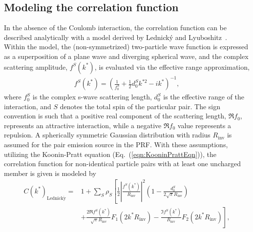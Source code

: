 \documentclass[ALICE,manyauthors]{cernphprep}
\begin{document}
\subsection{Modeling the correlation function}
\label{sec:ModelingCF}


In the absence of the Coulomb interaction, the correlation function can be described analytically with a model derived by Lednick\'y and Lyuboshitz~\cite{Lednicky:82}.
Within the model, the (non-symmetrized) two-particle wave function is expressed as a superposition of a plane wave and diverging spherical wave, and the complex scattering amplitude, $f^{S}(k^{*})$, is evaluated via the effective range approximation,
\begin{equation}
\begin{aligned}
f^{S}(k^{*}) = \left( \frac{1}{f^{S}_{0}} + \frac{1}{2}d^{S}_{0}k^{*2} - ik^{*} \right)^{-1},
\end{aligned}
\label{eqn:ScatteringParam}
\end{equation}
where $f^{S}_{0}$ is the complex s-wave scattering length, $d^{S}_{0}$ is the effective range of the interaction, and $S$ denotes the total spin of the particular pair.
The sign convention is such that a positive real component of the scattering length, $\Re f_{0}$, represents an attractive interaction, while a negative {\color{red}$\Re f_{0}$} {\color{blue}value} represents a repulsion.
A spherically symmetric Gaussian distribution with radius $R_{\mathrm{inv}}$  is assumed for the pair emission source in the PRF.
With these assumptions, utilizing the Koonin-Pratt equation (Eq.~{\color{blue}(}\ref{eqn:KooninPrattEqn}{\color{blue})}), the correlation function for non-identical particle pairs {\color{red}with at least one uncharged member is given} {\color{blue}is modeled} by~\cite{Lednicky:82}
\begin{equation}
\begin{aligned}
C(k^{*})_{\mathrm{Lednick\acute{y}}} = &1 + \sum_{S}\rho_{S}\left[\frac{1}{2}\left|\frac{f^{S}(k^{*})}{R_{\mathrm{inv}}}\right|^2\left(1-\frac{d^{S}_{0}}{2\sqrt{\pi}R_{\mathrm{inv}}}\right) \right. \\
&+ \left. \frac{2\Re f^{S}(k^{*})}{\sqrt{\pi}R_{\mathrm{inv}}}F_{1}(2k^{*}R_{\mathrm{inv}})-\frac{\Im f^{S}(k^{*})}{R_{\mathrm{inv}}}F_{2}(2k^{*}R_{\mathrm{inv}})\right],
\end{aligned}  
\label{eqn:LednickyEqn}
\end{equation}
\end{document}
